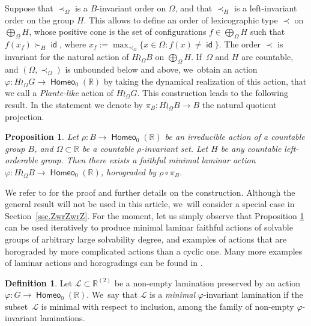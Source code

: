 \documentclass[JEP,XML,SOM,Unicode,NoFloatCountersInSection,published]{cedram}
\newtheorem{prop}[thm]{Proposition}
\theoremstyle{definition}
\newtheorem{dfn}[thm]{Definition}
\DeclareMathOperator{\homeo}{\mathsf{Homeo}}
\DeclareMathOperator{\id}{\mathsf{id}}
\newcommand{\R}{\mathbb{R}}
\newcommand{\Lcal}{\mathcal{L}}
\begin{document}
Suppose that $\prec_\Omega$ is a $B$-invariant order on $\Omega$, and that $\prec_H$ is a left-invariant order on the group $H$. This allows to define an order of lexicographic type $\prec$ on $\bigoplus_\Omega H$, whose positive cone is the set of configurations $f\in \bigoplus_\Omega H$ such that $f(x_f)\succ_H \id$, where $x_f:=\max_{\prec_{\Omega}}\{x\in \Omega : f(x)\neq \id\}.$ The order $\prec$ is invariant for the natural action of $H\wr_\Omega B$ on $\bigoplus_{\Omega} H$. If~$\Omega$ and $H$ are countable, and $(\Omega,\prec_\Omega)$ is unbounded below and above, we~obtain an action $\varphi\colon H \wr_\Omega G\to \homeo_0(\R)$ by taking the dynamical realization of this action, that we call a \emph{Plante-like} action of $H \wr_\Omega G$. This construction leads to the following result.
In the statement we denote by $\pi_B\colon H\wr_\Omega B\to B$ the natural quotient projection.

\begin{prop}\label{p-plante-like-general}
Let $\rho\colon B\to \homeo_0(\R)$ be an irreducible action of a countable group $B$, and $\Omega\subset \R$ be a countable $\rho$-invariant set. Let $H$ be any countable left-orderable group. Then there exists a faithful minimal laminar action $\varphi\colon H\wr_{\Omega} B\to \homeo_0(\R)$, horograded by $\rho\circ \pi_B$.
\end{prop}

We refer to \cite[Ex.\,8.1.8]{BMRT} for the proof and further details on the construction. Although the general result will not be used in this article, we~will consider a special case in Section~\ref{ssc.ZwrZwrZ}. For the moment, let us simply observe that Proposition \ref{p-plante-like-general} can be used iteratively to produce minimal laminar faithful actions of solvable groups of arbitrary large solvability degree, and examples of actions that are horograded by more complicated actions than a cyclic one. Many more examples of laminar actions and horogradings can be found in \cite{BMRT}.


\begin{dfn} Let $\Lcal\subset \R^{(2)}$ be a non-empty lamination preserved by an action $\varphi\colon G\to\homeo_0(\R)$. We~say that $\Lcal$ is a \emph{minimal} $\varphi$-invariant lamination if the subset~$\Lcal$ is minimal with respect to inclusion, among the family of non-empty $\varphi$-invariant laminations.
\end{dfn}
\end{document}
